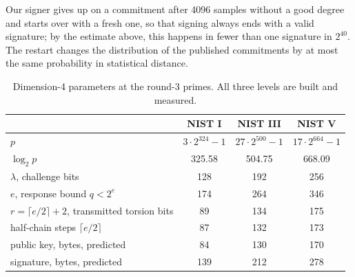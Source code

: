 \documentclass[version=preprint]{iacrcc}
\begin{document}
    Our signer gives up on a commitment after 4096 samples without a good
    degree and starts over with a fresh one, so that signing always ends with
    a valid signature; by the estimate above, this happens in fewer than one
    signature in $2^{40}$. The restart changes the distribution of the
    published commitments by at most the same probability in statistical
    distance.

    \begin{table}[t]
        \centering
        \begin{threeparttable}
            \caption{Dimension-4 parameters at the round-3 primes. All three levels
                are built and measured.}
            \label{tab:params}
            \begin{tabular}{l c c c}
                \toprule
                & NIST I & NIST III & NIST V \\
                \midrule
                $p$\tnote{a} & $3 \cdot 2^{324} - 1$ & $27 \cdot 2^{500} - 1$ & $17 \cdot 2^{664} - 1$ \\
                $\log_2 p$\tnote{a} & 325.58 & 504.75 & 668.09 \\
                $\lambda$, challenge bits\tnote{a} & 128 & 192 & 256 \\
                $e$, response bound $q < 2^e$\tnote{b} & 174 & 264 & 346 \\
                $r = \lceil e/2 \rceil + 2$, transmitted torsion bits\tnote{c} & 89 & 134 & 175 \\
                half-chain steps $\lceil e/2 \rceil$\tnote{c} & 87 & 132 & 173 \\
                \addlinespace
                public key, bytes, predicted\tnote{d} & 84 & 130 & 170 \\
                signature, bytes, predicted\tnote{d} & 139 & 212 & 278 \\
                

\end{tabular}
\end{threeparttable}
\end{table}
\end{document}
